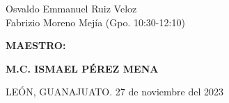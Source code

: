\begin{titlepage}
\begin{minipage}{180mm}
{{{				Osvaldo Emmanuel Ruiz Veloz\\
				Fabrizio Moreno Mejía}} (Gpo. 10:30-12:10)
				\par
		}
		\vspace{10mm}
		{\fontsize{14}{18pt}\selectfont{}
			\textbf{
				MAESTRO:
			}\par
		}
		\vspace{5mm}
		{\fontsize{12}{16pt}\selectfont{}
			\textbf{
				M.C. ISMAEL PÉREZ MENA
			}\par
		}
		\vspace{12mm}
		{\fontsize{10}{14pt}\selectfont{}
			LEÓN, GUANAJUATO. \hspace{70mm} 27 de noviembre del 2023\par
		}
	\end{minipage}
\end{titlepage}
\restoregeometry